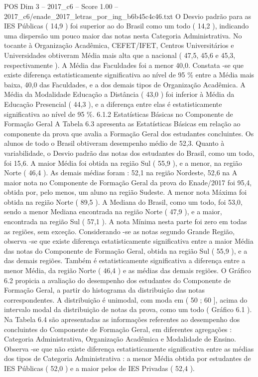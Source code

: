 \begin{textsample}{POS Dim 3 – 2017\_c6 – Score 1.00 – 2017\_c6/enade\_2017\_letras\_por\_ing\_b6b45c4c46.txt}
O Desvio padrão para as IES Públicas ( 14,9 ) foi superior ao do Brasil como um todo ( 14,2 ), indicando uma dispersão um pouco maior das notas nesta Categoria Administrativa.
No tocante à Organização Acadêmica, CEFET/IFET, Centros Universitários e Universidades obtiveram Média mais alta que a nacional ( 47,5, 45,6 e 45,3, respectivamente ).
A Média das Faculdades foi a menor 40,0.
Constata -se que existe diferença estatisticamente significativa ao nível de 95 \% entre a Média mais baixa, 40,0 das Faculdades, e a dos demais tipos de Organização Acadêmica.
A Média da Modalidade Educação a Distância ( 43,0 ) foi inferior à Média da Educação Presencial ( 44,3 ), e a diferença entre elas é estatisticamente significativa ao nível de 95 \%. 6.1.2 Estatísticas Básicas no Componente de Formação Geral A Tabela 6.3 apresenta as Estatísticas Básicas em relação ao componente da prova que avalia a Formação Geral dos estudantes concluintes.
Os alunos de todo o Brasil obtiveram desempenho médio de 52,3.
Quanto à variabilidade, o Desvio padrão das notas dos estudantes do Brasil, como um todo, foi 15,6.
A maior Média foi obtida na região Sul ( 55,9 ), e a menor, na região Norte ( 46,4 ).
As demais médias foram : 52,1 na região Nordeste, 52,6 na A maior nota no Componente de Formação Geral da prova do Enade/2017 foi 95,4, obtida por, pelo menos, um aluno na região Sudeste.
A menor nota Máxima foi obtida na região Norte ( 89,5 ).
A Mediana do Brasil, como um todo, foi 53,0, sendo a menor Mediana encontrada na região Norte ( 47,9 ), e a maior, encontrada na região Sul ( 57,1 ).
A nota Mínima nesta parte foi zero em todas as regiões, sem exceção.
Considerando -se as notas segundo Grande Região, observa -se que existe diferença estatisticamente significativa entre a maior Média das notas do Componente de Formação Geral, obtida na região Sul ( 55,9 ), e a das demais regiões.
Também é estatisticamente significativa a diferença entre a menor Média, da região Norte ( 46,4 ) e as médias das demais regiões.
O Gráfico 6.2 propicia a avaliação do desempenho dos estudantes do Componente de Formação Geral, a partir do histograma da distribuição das notas correspondentes.
A distribuição é unimodal, com moda em ( 50 ; 60 ], acima do intervalo modal da distribuição de notas da prova, como um todo ( Gráfico 6.1 ).
Na Tabela 6.4 são apresentadas as informações referentes ao desempenho dos concluintes do Componente de Formação Geral, em diferentes agregações : Categoria Administrativa, Organização Acadêmica e Modalidade de Ensino.
Observa -se que não existe diferença estatisticamente significativa entre as médias dos tipos de Categoria Administrativa : a menor Média obtida por estudantes de IES Públicas ( 52,0 ) e a maior pelos de IES Privadas ( 52,4 ).

\end{textsample}
